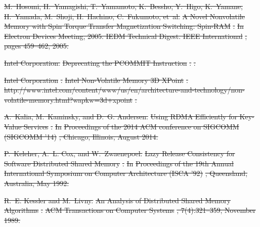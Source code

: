 \documentclass[sigconf]{acmart}
\renewcommand{\em}{\it}
\providecommand{\DIFdel}[1]{{\protect\color{red}\sout{#1}}}                      %
\providecommand{\DIFdelbegin}{} %
\begin{document}
{\DIFdelbegin %
\DIFdel{M.~Hosomi, H.~Yamagishi, T.~Yamamoto, K.~Bessho, Y.~Higo, K.~Yamane, H.~Yamada,
  M.~Shoji, H.~Hachino, C.~Fukumoto, et~al.
}%
\DIFdel{A Novel Nonvolatile Memory with Spin Torque Transfer Magnetization
  Switching: Spin-RAM}%
\DIFdel{.
}%
\DIFdel{In }%
\DIFdel{Electron Devices Meeting, 2005. IEDM Technical Digest. IEEE
  International}%
\DIFdel{, pages 459--462, 2005.
}%

\DIFdel{Intel Corporation.}%
\DIFdel{Deprecating the PCOMMIT Instruction}%
\DIFdel{.
}%
\DIFdel{.
}%

\DIFdel{Intel Corporation}%
\DIFdel{.
}%
\DIFdel{Intel Non-Volatile Memory 3D XPoint}%
\DIFdel{.
}%
\DIFdel{http://www.intel.com/content/www/us/en/architecture-and-technology/non-volatile-memory.html?wapkw=3d+xpoint}%
\DIFdel{.
}%

\DIFdel{A.~Kalia, M.~Kaminsky, and D.~G. Andersen.
}%
\DIFdel{Using RDMA Efficiently for Key-Value Services}%
\DIFdel{.
}%
\DIFdel{In }%
\DIFdel{Proceedings of the 2014 ACM conference on SIGCOMM (SIGCOMM
  ’14)}%
\DIFdel{, Chicago, Illinois, August 2014.
}%

\DIFdel{P.~Keleher, A.~L. Cox, and W.~Zwaenepoel.
}%
\DIFdel{Lazy Release Consistency for Software Distributed Shared Memory}%
\DIFdel{.
}%
\DIFdel{In }%
\DIFdel{Proceedings of the 19th Annual International Symposium on
  Computer Architecture (ISCA '92)}%
\DIFdel{, Queensland, Australia, May 1992.
}%

\DIFdel{R.~E. Kessler and M.~Livny.
}%
\DIFdel{An Analysis of Distributed Shared Memory Algorithms}%
\DIFdel{.
}%
\DIFdel{ACM Transactions on Computer Systems}%
\DIFdel{, 7(4):321–359, November
  1989.
}%

}
\end{document}
